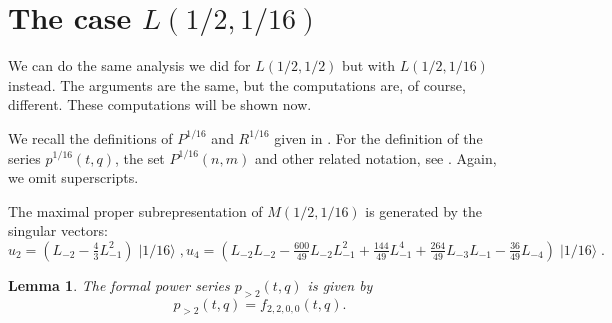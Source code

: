 \documentclass[a4paper, 12pt, reqno]{amsart}
\newtheorem{lemma}[theorem]{Lemma}
\theoremstyle{remark}
\DeclareMathOperator{\vacsixteen}{|1/16\rangle}
\begin{document}
\section{The case $L(1/2, 1/16)$}
\label{sec:case-l12-116}

We can do the same analysis we did for $L(1/2, 1/2)$ but with $L(1/2, 1/16)$ instead.
The arguments are the same, but the computations are, of course, different.
These computations will be shown now.

We recall the definitions of $P^{1/16}$ and $R^{1/16}$ given in .
For the definition of the series $p^{1/16}(t, q)$, the set $P^{1/16}(n, m)$ and other related notation, see .
Again, we omit superscripts.

The maximal proper subrepresentation of $M(1/2, 1/16)$ is generated by the singular vectors:
\begin{equation*}
  u_2 = (L_{-2} - \tfrac{4}{3}L_{-1}^2)\vacsixteen, u_4 = (L_{-2}L_{-2} - \tfrac{600}{49}L_{-2}L_{-1}^2 + \tfrac{144}{49}L_{-1}^4 + \tfrac{264}{49}L_{-3}L_{-1} - \tfrac{36}{49}L_{-4})\vacsixteen.
\end{equation*}

\begin{lemma}
  \label{lmm:41}
  The formal power series $p_{>2}(t, q)$ is given by
  \begin{equation*}
    p_{>2}(t, q) = f_{2, 2, 0, 0}(t, q).
  \end{equation*}
\end{lemma}
\end{document}

